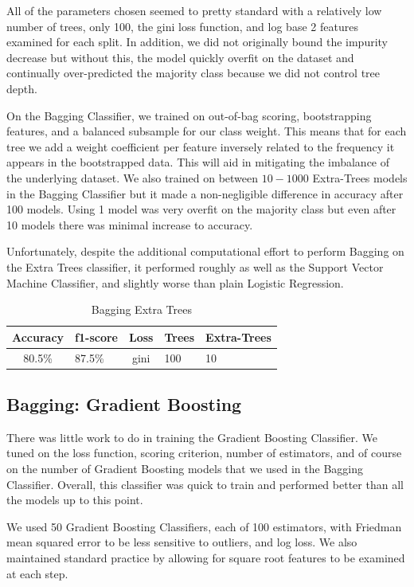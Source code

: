 \documentclass[conference]{IEEEtran}
\begin{document}
All of the parameters chosen seemed to pretty standard with a relatively low number of trees, only 100, the gini loss function, and log base 2 features examined for each split. In addition, we did not originally bound the impurity decrease but without this, the model quickly overfit on the dataset and continually over-predicted the majority class because we did not control tree depth. 

On the Bagging Classifier, we trained on out-of-bag scoring, bootstrapping features, and a balanced subsample for our class weight. This means that for each tree we add a weight coefficient per feature inversely related to the frequency it appears in the bootstrapped data. This will aid in mitigating the imbalance of the underlying dataset. We also trained on between $10-1000$ Extra-Trees models in the Bagging Classifier but it made a non-negligible difference in accuracy after 100 models. Using 1 model was very overfit on the majority class but even after 10 models there was minimal increase to accuracy.

Unfortunately, despite the additional computational effort to perform Bagging on the Extra Trees classifier, it performed roughly as well as the Support Vector Machine Classifier, and slightly worse than plain Logistic Regression. 

\begin{table}[H]
\centering
  \begin{tabular}{|c|l|c|l|l|} \hline 
 
 Accuracy&  f1-score&Loss& Trees&Extra-Trees\\ \hline 

 80.5\%&  87.5\%&gini& 100&10\\\hline 
\end{tabular}

 \caption{Bagging Extra Trees}
 \end{table}

\subsection{Bagging: Gradient Boosting}
There was little work to do in training the Gradient Boosting Classifier. We tuned on the loss function, scoring criterion, number of estimators, and of course on the number of Gradient Boosting models that we used in the Bagging Classifier. Overall, this classifier was quick to train and performed better than all the models up to this point.

We used 50 Gradient Boosting Classifiers, each of 100 estimators, with Friedman mean squared error to be less sensitive to outliers, and log loss. We also maintained standard practice by allowing for square root features to be examined at each step. 
\end{document}
